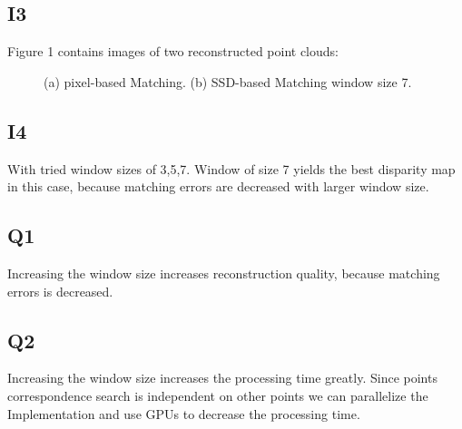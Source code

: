 \documentclass[a4paper, twoside, english]{article}
\begin{document}
\subsection{I3}

Figure 1 contains images of two reconstructed point clouds: 

\begin{figure}[ht]
 \centerline
 {
  \qquad
 }
 \caption[Color inversion]{(a) pixel-based Matching. (b) SSD-based Matching window size 7.}
 \label{fig:inversion}
\end{figure}

\subsection{I4}
With tried window sizes of 3,5,7. Window of size 7 yields the best disparity map in this case, because matching errors are decreased with larger window size.

\subsection{Q1}
Increasing the window size increases reconstruction quality, because matching errors is decreased.
\subsection{Q2}
Increasing the window size increases the processing time greatly. Since points correspondence search is independent on other points we can parallelize the Implementation and use GPUs to decrease the processing time. 
\end{document}
